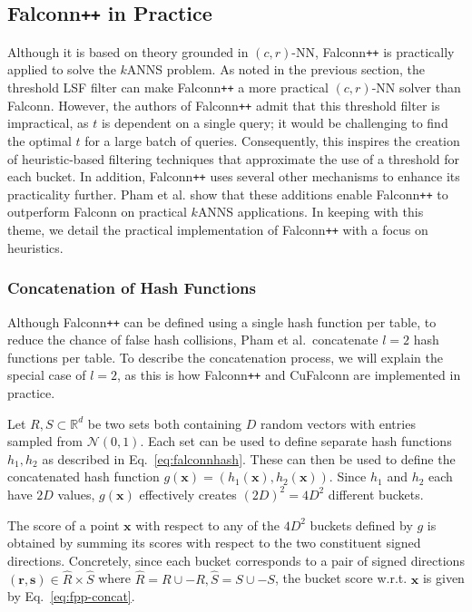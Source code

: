 \documentclass{article}
\newcommand{\Rd}{\mathbb{R}^d}
\newcommand{\bx}{\mathbf{x}}
\newcommand{\br}{\mathbf{r}}
\newcommand{\bs}{\mathbf{s}}
\newcommand{\mN}{\mathcal{N}}
\newcommand{\cf}{CuFalconn\xspace}
\newcommand{\fpp}{Falconn\texttt{++}\xspace}
\newcommand{\crNN}{$(c, r)$-NN\xspace}
\begin{document}

\subsection{\fpp in Practice}
\label{sec:fpp-in-practice}

Although it is based on theory grounded in \crNN, \fpp is practically applied to solve the $k$ANNS problem. As noted in the previous section, the threshold LSF filter can make \fpp a more practical \crNN solver than Falconn. However, the authors of \fpp admit that this threshold filter is impractical, as $t$ is dependent on a single query; it would be challenging to find the optimal $t$ for a large batch of queries. Consequently, this inspires the creation of heuristic-based filtering techniques that approximate the use of a threshold for each bucket. In addition, \fpp uses several other mechanisms to enhance its practicality further. Pham et al. show that these additions enable \fpp to outperform Falconn on practical $k$ANNS applications. In keeping with this theme, we detail the practical implementation of \fpp with a focus on heuristics.

\subsubsection{Concatenation of Hash Functions}

Although \fpp can be defined using a single hash function per table, to reduce the chance of false hash collisions, Pham et al.\ concatenate $l=2$ hash functions per table. To describe the concatenation process, we will explain the special case of $l=2$, as this is how \fpp and \cf are implemented in practice.

Let $R, S \subset \Rd$  be two sets both containing $D$ random vectors with entries sampled from $\mN(0, 1)$. Each set can be used to define separate hash functions $h_1, h_2$ as described in Eq.~\ref{eq:falconnhash}. These can then be used to define the concatenated hash function $g(\bx) = (h_1(\bx), h_2(\bx))$. Since $h_1$ and $h_2$ each have $2D$ values, $g(\bx)$ effectively creates $(2D)^2 = 4D^2$ different buckets.

The score of a point $\bx$ with respect to any of the $4D^2$ buckets defined by $g$ is obtained by summing its scores with respect to the two constituent signed directions. Concretely, since each bucket corresponds to a pair of signed directions $(\br, \bs) \in \widehat{R} \times \widehat{S}$ where $\widehat{R} = R \cup -R, \widehat{S} = S \cup -S$, the bucket score w.r.t. $\bx$ is given by Eq.~\ref{eq:fpp-concat}.
\end{document}
